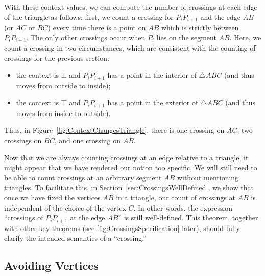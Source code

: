 With these context values, we can compute the number of crossings at each edge of the triangle as follows: first, we count a crossing for $P_iP_{i+1}$ and the edge $AB$ (or $AC$ or $BC$) every time there is a point on $AB$ which is strictly between $P_iP_{i+1}$. The only other crossings occur when $P_i$ lies on the segment $AB$. Here, we count a crossing in two circumstances, which are consistent with the counting of crossings for the previous section:
\begin{itemize}
\item the context is $\bot$ and $P_iP_{i+1}$ has a point in the interior of $\triangle ABC$ (and thus moves from outside to inside);
\item the context is $\top$ and $P_iP_{i+1}$ has a point in the exterior of $\triangle ABC$ (and thus moves from inside to outside).
\end{itemize}

Thus, in Figure~\ref{fig:ContextChangesTriangle}, there is one crossing on $AC$, two crossings on $BC$, and one crossing on $AB.$

Now that we are always counting crossings at an edge relative to a triangle, it might appear that we have rendered our notion too specific. We will still need to be able to count crossings at an arbitrary segment $AB$ without mentioning triangles. To facilitate this, in Section~\ref{sec:CrossingsWellDefined}, we show that once we have fixed the vertices $AB$ in a triangle, our count of crossings at $AB$ is independent of the choice of the vertex $C$. In other words, the expression ``crossings of $P_iP_{i+1}$ at the edge $AB$'' is still well-defined. This theorem, together with other key theorems (see \ref{fig:CrossingsSpecification} later), should fully clarify the intended semantics of a ``crossing.''

\subsection{Avoiding Vertices}\label{sec:EdgeCases}

